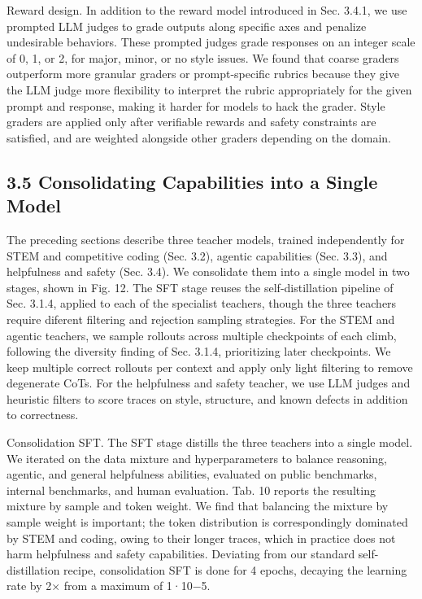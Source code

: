 \documentclass[
  10
]{article}
\begin{document}
Reward design. In addition to the reward model introduced in Sec. 3.4.1,
we use prompted LLM judges to grade outputs along specific axes and
penalize undesirable behaviors. These prompted judges grade responses on
an integer scale of 0, 1, or 2, for major, minor, or no style issues. We
found that coarse graders outperform more granular graders or
prompt-specific rubrics because they give the LLM judge more flexibility
to interpret the rubric appropriately for the given prompt and response,
making it harder for models to hack the grader. Style graders are
applied only after verifiable rewards and safety constraints are
satisfied, and are weighted alongside other graders depending on the
domain.

\subsection{3.5 Consolidating Capabilities into a Single
Model}\label{consolidating-capabilities-into-a-single-model}

The preceding sections describe three teacher models, trained
independently for STEM and competitive coding (Sec. 3.2), agentic
capabilities (Sec. 3.3), and helpfulness and safety (Sec. 3.4). We
consolidate them into a single model in two stages, shown in Fig. 12.
The SFT stage reuses the self-distillation pipeline of Sec. 3.1.4,
applied to each of the specialist teachers, though the three teachers
require diferent filtering and rejection sampling strategies. For the
STEM and agentic teachers, we sample rollouts across multiple
checkpoints of each climb, following the diversity finding of Sec.
3.1.4, prioritizing later checkpoints. We keep multiple correct rollouts
per context and apply only light filtering to remove degenerate CoTs.
For the helpfulness and safety teacher, we use LLM judges and heuristic
filters to score traces on style, structure, and known defects in
addition to correctness.

Consolidation SFT. The SFT stage distills the three teachers into a
single model. We iterated on the data mixture and hyperparameters to
balance reasoning, agentic, and general helpfulness abilities, evaluated
on public benchmarks, internal benchmarks, and human evaluation. Tab. 10
reports the resulting mixture by sample and token weight. We find that
balancing the mixture by sample weight is important; the token
distribution is correspondingly dominated by STEM and coding, owing to
their longer traces, which in practice does not harm helpfulness and
safety capabilities. Deviating from our standard self-distillation
recipe, consolidation SFT is done for 4 epochs, decaying the learning
rate by 2× from a maximum of 1·10−5.
\end{document}
